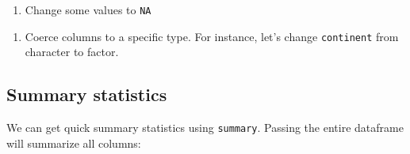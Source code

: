 \documentclass[]{book}
\newenvironment{Shaded}{\begin{snugshade}}{\end{snugshade}}
\newcommand{\KeywordTok}[1]{\textcolor[rgb]{0.13,0.29,0.53}{\textbf{#1}}}
\newcommand{\DecValTok}[1]{\textcolor[rgb]{0.00,0.00,0.81}{#1}}
\newcommand{\StringTok}[1]{\textcolor[rgb]{0.31,0.60,0.02}{#1}}
\newcommand{\CommentTok}[1]{\textcolor[rgb]{0.56,0.35,0.01}{\textit{#1}}}
\newcommand{\OtherTok}[1]{\textcolor[rgb]{0.56,0.35,0.01}{#1}}
\newcommand{\OperatorTok}[1]{\textcolor[rgb]{0.81,0.36,0.00}{\textbf{#1}}}
\newcommand{\NormalTok}[1]{#1}
\providecommand{\tightlist}{%
  \setlength{\itemsep}{0pt}\setlength{\parskip}{0pt}}
\begin{document}
\begin{enumerate}
\def\labelenumi{\arabic{enumi}.}
\setcounter{enumi}{1}
\tightlist
\item
  Change some values to \texttt{NA}
\end{enumerate}

\begin{Shaded}
\end{Shaded}

\begin{enumerate}
\def\labelenumi{\arabic{enumi}.}
\setcounter{enumi}{2}
\tightlist
\item
  Coerce columns to a specific type. For instance, let's change
  \texttt{continent} from character to factor.
\end{enumerate}

\begin{Shaded}
\end{Shaded}

\subsection{Summary statistics}\label{summary-statistics}

We can get quick summary statistics using \texttt{summary}. Passing the
entire dataframe will summarize all columns:
\end{document}
